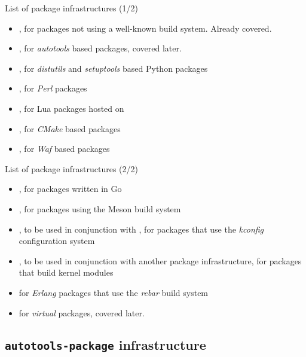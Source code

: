 \begin{frame}{List of package infrastructures (1/2)}
  \begin{itemize}
  \item {}, for packages not using a well-known
    build system. Already covered.
  \item {}, for {\em autotools} based packages,
    covered later.
  \item {}, for {\em distutils} and {\em
      setuptools} based Python packages
  \item {}, for {\em Perl} packages
  \item {}, for Lua packages hosted on
  \item {}, for {\em CMake} based packages
  \item {}, for {\em Waf} based packages
  \end{itemize}
\end{frame}

\begin{frame}{List of package infrastructures (2/2)}
  \begin{itemize}
  \item {}, for packages written in Go
  \item {}, for packages using the Meson build
    system
  \item {}, to be used in conjunction with
    , for packages that use the {\em kconfig}
    configuration system
  \item {}, to be used in conjunction with
    another package infrastructure, for packages that build kernel
    modules
  \item {} for {\em Erlang} packages that use the
    {\em rebar} build system
  \item {} for {\em virtual} packages, covered
    later.
  \end{itemize}
\end{frame}

\subsection{{\tt autotools-package} infrastructure}

